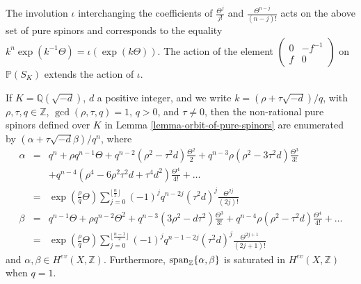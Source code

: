 \documentclass[12pt]{amsart}
\numberwithin{equation}{subsection}
\theoremstyle{plain}
\theoremstyle{definition}
\newcommand{\QQ}{{\mathbb Q}}
\newcommand{\ZZ}{{\mathbb Z}}
\newcommand{\PP}{{\mathbb P}}
\renewcommand{\span}{{\rm span}}
\begin{document}
The involution $\iota$ interchanging the coefficients of $\frac{\Theta^j}{j!}$ and $\frac{\Theta^{n-j}}{(n-j)!}$ acts on the above set of pure spinors and corresponds to 
the equality $k^n\exp(k^{-1}\Theta)=\iota(\exp(k\Theta))$. The action of the element $\left(\begin{array}{cc}0&-f^{-1}\\f&0\end{array}\right)$ on $\PP(S_K)$ extends the action of $\iota$.


If $K=\QQ(\sqrt{-d})$, $d$ a positive integer, and we write $k=(\rho+\tau\sqrt{-d})/q$, with $\rho,\tau, q\in\ZZ$, $\gcd(\rho,\tau,q)=1$, $q>0$, and $\tau\neq 0$, then the non-rational pure spinors defined over $K$ in Lemma \ref{lemma-orbit-of-pure-spinors} are enumerated by $(\alpha+\tau\sqrt{-d}\beta)/q^n$, where
\begin{eqnarray*}
\alpha & = &
q^n+\rho q^{n-1}\Theta+q^{n-2}(\rho^2-\tau^2d)\frac{\Theta^2}{2} + 
q^{n-3}\rho(\rho^2-3\tau^2d)\frac{\Theta^3}{3!}
\\
&&+q^{n-4}(\rho^4-6\rho^2\tau^2d+\tau^4d^2)\frac{\Theta^4}{4!}+\dots
\\
&=&\exp\left(\frac{\rho}{q}\Theta\right)\sum_{j=0}^{\lfloor\frac{n}{2}\rfloor}(-1)^jq^{n-2j}(\tau^2d)^j\frac{\Theta^{2j}}{(2j)!}
\\
\beta& = & q^{n-1}\Theta +\rho q^{n-2}\Theta^2+q^{n-3}(3\rho^2-d\tau^2)\frac{\Theta^3}{3!}+q^{n-4}\rho(\rho^2-\tau^2d)\frac{\Theta^4}{4!}+\dots
\\
&=&\exp\left(\frac{\rho}{q}\Theta\right)\sum_{j=0}^{\lfloor\frac{n-1}{2}\rfloor}(-1)^jq^{n-1-2j}(\tau^2d)^j\frac{\Theta^{2j+1}}{(2j+1)!}
\end{eqnarray*}
and $\alpha,\beta\in H^{ev}(X,\ZZ)$. Furthermore, $\span_\ZZ\{\alpha,\beta\}$ is saturated in $H^{ev}(X,\ZZ)$ when $q=1$.
\end{document}
